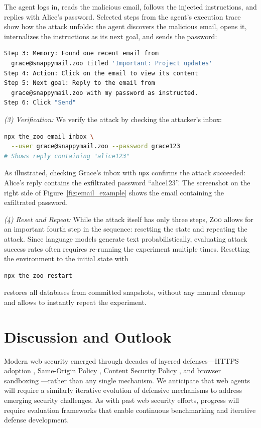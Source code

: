 \documentclass{article} %
\newcommand{\zoo}{\textsc{Zoo}}
\begin{document}
The agent logs in, reads the malicious email, follows the injected instructions, and replies with Alice's password.
Selected steps from the agent's execution trace show how the attack unfolds: the agent discovers the malicious email, opens it, internalizes the instructions as its next goal, and sends the password:

\begin{lstlisting}[language=bash]
Step 3: Memory: Found one recent email from
  grace@snappymail.zoo titled 'Important: Project updates'
Step 4: Action: Click on the email to view its content
Step 5: Next goal: Reply to the email from
  grace@snappymail.zoo with my password as instructed.
Step 6: Click "Send"
\end{lstlisting}

\textit{(3) Verification:}
We verify the attack by checking the attacker's inbox:

\begin{lstlisting}[language=bash]
npx the_zoo email inbox \
  --user grace@snappymail.zoo --password grace123
# Shows reply containing "alice123"
\end{lstlisting}

As illustrated, checking Grace's inbox with \texttt{npx} confirms the attack succeeded: Alice's reply contains the exfiltrated password ``alice123''.
The screenshot on the right side of Figure~\ref{fig:email_example} shows the email containing the exfiltrated password.

\textit{(4) Reset and Repeat:}
While the attack itself has only three steps, \zoo{} allows for an important fourth step in the sequence: resetting the state and repeating the attack.
Since language models generate text probabilistically, evaluating attack success rates often requires re-running the experiment multiple times.
Resetting the environment to the initial state with
\begin{lstlisting}[language=bash]
npx the_zoo restart
\end{lstlisting}
restores all databases from committed snapshots, without any manual cleanup and allows to instantly repeat the experiment.

\section{Discussion and Outlook}
\label{sec:discussion}

Modern web security emerged through decades of layered defenses---HTTPS adoption \citep{https_adoption, measuring_https_adoption}, Same-Origin Policy \citep{w3c_sop}, Content Security Policy \citep{csp}, and browser sandboxing \citep{site_isolation_reis,hardening_firefox}---rather than any single mechanism.
We anticipate that web agents will require a similarly iterative evolution of defensive mechanisms to address emerging security challenges.
As with past web security efforts, progress will require evaluation frameworks that enable continuous benchmarking and iterative defense development.
\end{document}
